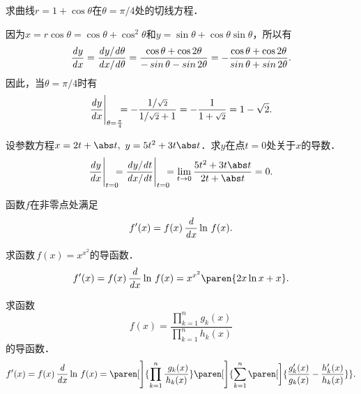 \begin{example*}
  求曲线\(r = 1 + \cos\theta\)在\(\theta = \pi/4\)处的切线方程．

  \begin{remark}
    因为\(x = r \cos\theta = \cos\theta + \cos^2\theta\)和\(y = \sin\theta + \cos\theta \sin\theta\)，所以有
    \begin{equation*}
      \dydx
      = \frac{\dy/\!\dtheta}{\dx/\!\dtheta}
      = \frac{\cos\theta + \cos2\theta}{-\sin\theta - \sin2\theta}
      = - \frac{\cos\theta + \cos2\theta}{\sin\theta + \sin2\theta}.
    \end{equation*}
    因此，当\(\theta = \pi/4\)时有
    \begin{equation*}
      \frac{\mathop{}\!\mathit{d} y}{\mathop{}\!\mathit{d} x}\Bigg\vert_{\theta=\frac\pi4} \mkern-11mu
      = - \frac{1/{\scriptstyle\sqrt2}}{1/{\scriptstyle\sqrt2} + 1}
      = - \frac{1}{1 + {\scriptstyle\sqrt2}}
      = 1 - \sqrt2.
    \end{equation*}
  \end{remark}
\end{example*}

\begin{example*}
  设参数方程\(x = 2t + \abs t,\ y = 5t^2 + 3t\abs t\)．求\(y\)在点\(t = 0\)处关于\(x\)的导数．
  \begin{equation*}
    \dydx\Bigg\vert_{t=0} \mkern-11mu
    = \frac{\dy/\!\dt}{\dx/\!\dt} \Bigg\vert_{t=0} \mkern-11mu
    = \lim_{t\to0} \frac{5t^2 + 3t\abs t}{2t + \abs t}
    = 0.
  \end{equation*}
\end{example*}

\begin{theorem*}[对数求导法]
  函数\(f\)在非零点处满足
  \begin{equation*}
    f'(x) = f(x) \,\frac{\mathop{}\!\mathit{d}}{\mathop{}\!\mathit{d} x} \ln\,f(x).
  \end{equation*}
\end{theorem*}

\begin{example*}
  求函数\(\,f(x) = x^{x^2}\)的导函数．
  \begin{equation*}
    f'(x)
    = f(x) \,\ddx \ln\,f(x)
    = x^{x^2} \paren{2x\ln x + x}.
  \end{equation*}
\end{example*}

\begin{example*}
  求函数
  \begin{equation*}
    f(x) = \frac{\prod\limits_{k=1}^n g_k(x)}{\prod\limits_{k=1}^n h_k(x)}
  \end{equation*}
  的导函数．
  \begin{equation*}
    f'(x)
    = f(x) \,\ddx \ln\,f(x)
    = \paren[\Bigg]{\prod_{k=1}^n \frac{\ g_k(x)}{h_k(x)}}
    \paren[\Bigg]{\sum_{k=1}^n \paren[\bigg]{\frac{g_k'(x)}{g_k(x)} - \frac{h_k'(x)}{h_k(x)}}}.
  \end{equation*}
\end{example*}

